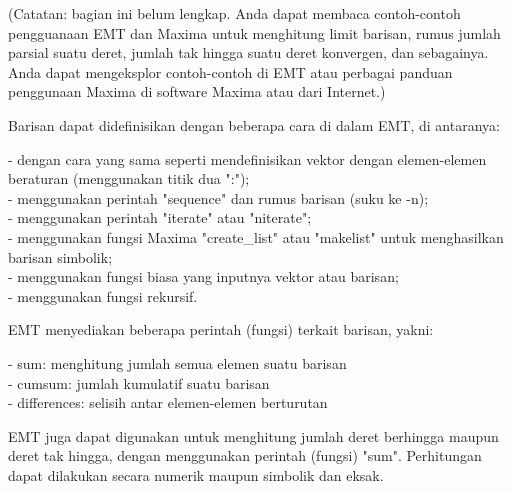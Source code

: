 \documentclass{article}
\begin{document}
\begin{eulernotebook}
\begin{eulercomment}
\begin{eulercomment}
\begin{eulercomment}
\begin{eulercomment}
\begin{eulercomment}
\begin{eulercomment}
\begin{eulerformula}
\[\]
\end{eulerformula}
\begin{eulercomment}
\begin{eulercomment}
\begin{eulercomment}
(Catatan: bagian ini belum lengkap. Anda dapat membaca contoh-contoh
pengguanaan EMT dan Maxima untuk menghitung limit barisan, rumus
jumlah parsial suatu deret, jumlah tak hingga suatu deret konvergen,
dan sebagainya. Anda dapat mengeksplor contoh-contoh di EMT atau
perbagai panduan penggunaan Maxima di software Maxima atau dari
Internet.)

Barisan dapat didefinisikan dengan beberapa cara di dalam EMT, di
antaranya:

- dengan cara yang sama seperti mendefinisikan vektor dengan
elemen-elemen beraturan (menggunakan titik dua ":");\\
- menggunakan perintah "sequence" dan rumus barisan (suku ke -n);\\
- menggunakan perintah "iterate" atau "niterate";\\
- menggunakan fungsi Maxima "create\_list" atau "makelist" untuk
menghasilkan barisan simbolik;\\
- menggunakan fungsi biasa yang inputnya vektor atau barisan;\\
- menggunakan fungsi rekursif.

EMT menyediakan beberapa perintah (fungsi) terkait barisan, yakni:

- sum: menghitung jumlah semua elemen suatu barisan\\
- cumsum: jumlah kumulatif suatu barisan\\
- differences: selisih antar elemen-elemen berturutan

EMT juga dapat digunakan untuk menghitung jumlah deret berhingga
maupun deret tak hingga, dengan menggunakan perintah (fungsi) "sum".
Perhitungan dapat dilakukan secara numerik maupun simbolik dan eksak.


\end{eulercomment}
\end{eulercomment}
\end{eulercomment}
\end{eulercomment}
\end{eulercomment}
\end{eulercomment}
\end{eulercomment}
\end{eulercomment}
\end{eulercomment}
\end{eulernotebook}
\end{document}
